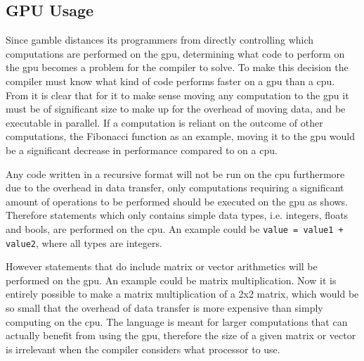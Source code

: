 \subsection*{GPU Usage}\label{GPUCode}
Since \gls{gamble} distances its programmers from directly controlling which computations are performed on the \acrshort{gpu}, determining what code to perform on the \acrshort{gpu} becomes a problem for the compiler to solve.
To make this decision the compiler must know what kind of code performs faster on a \acrshort{gpu} than a \acrshort{cpu}.
From  it is clear that for it to make sense moving any computation to the \acrshort{gpu} it must be of significant size to make up for the overhead of moving data, and be executable in parallel.
If a computation is reliant on the outcome of other computations, the Fibonacci function as an example, moving it to the \acrshort{gpu} would be a significant decrease in performance compared to on a \acrshort{cpu}.

Any code written in a recursive format will not be run on the \acrshort{cpu} furthermore due to the overhead in data transfer, only computations requiring a significant amount of operations to be performed should be executed on the \acrshort{gpu} as  shows.
Therefore statements which only contains simple data types, i.e. integers, floats and bools, are performed on the \acrshort{cpu}.
An example could be \texttt{value = value1 + value2}, where all types are integers.

However statements that do include matrix or vector arithmetics will be performed on the \acrshort{gpu}.
An example could be matrix multiplication.
Now it is entirely possible to make a matrix multiplication of a 2x2 matrix, which would be so small that the overhead of data transfer is more expensive than simply computing on the \acrshort{cpu}. %
The language is meant for larger computations that can actually benefit from using the \acrshort{gpu}, therefore the size of a given matrix or vector is irrelevant when the compiler considers what processor to use. 
